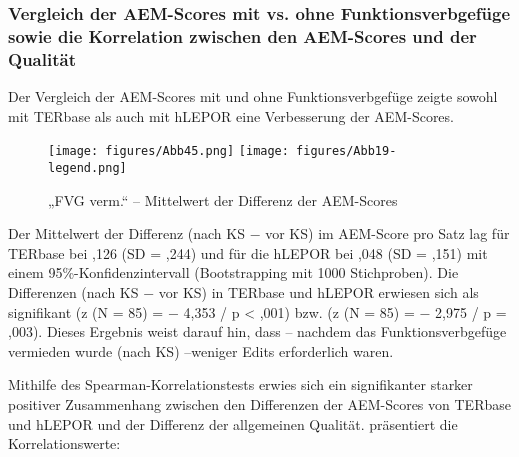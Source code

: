 \subsubsection{\label{sec:5.3.2.6}Vergleich der AEM-Scores mit vs. ohne Funktionsverbgefüge sowie die Korrelation zwischen den AEM-Scores und der Qualität}

Der Vergleich der AEM-Scores mit und ohne Funktionsverbgefüge zeigte sowohl mit TERbase als auch mit hLEPOR eine Verbesserung der AEM-Scores.


\begin{figure}


\texttt{[image: figures/Abb45.png]}
\texttt{[image: figures/Abb19-legend.png]}
\caption{\label{fig:05:45}   „FVG verm.“ -- Mittelwert der Differenz der AEM-Scores}
\end{figure}

Der Mittelwert der Differenz (nach KS $-$ vor KS) im AEM-Score pro Satz lag für TERbase bei ,126 (SD = ,244) und für die hLEPOR bei ,048 (SD = ,151) mit einem 95\%\nobreakdash-Konfidenzintervall (Bootstrapping mit 1000 Stichproben). Die Differenzen (nach KS $-$ vor KS) in TERbase und hLEPOR erwiesen sich als signifikant (z (N = 85) = $-$ 4,353 / p < ,001) bzw. (z (N = 85) = $-$ 2,975 / p = ,003). Dieses Ergebnis weist darauf hin, dass -- nachdem das Funktionsverbgefüge vermieden wurde (nach KS) –weniger Edits erforderlich waren.


Mithilfe des Spearman-Korrelationstests erwies sich ein signifikanter starker positiver Zusammenhang zwischen den Differenzen der AEM-Scores von TERbase und hLEPOR und der Differenz der allgemeinen Qualität.  präsentiert die Korrelationswerte:


